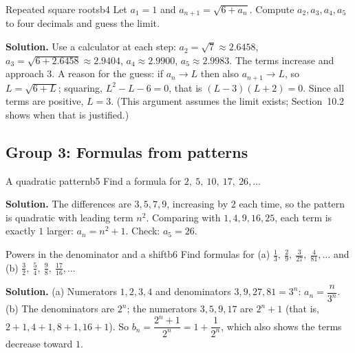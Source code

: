 \documentclass[11pt]{article}
\begin{document}
\begin{exmp}{Repeated square roots}{b4}
Let $a_1=1$ and $a_{n+1}=\sqrt{6+a_n}$. Compute $a_2,a_3,a_4,a_5$ to four decimals and guess the limit.

\textbf{Solution.} Use a calculator at each step: $a_2=\sqrt7\approx2.6458$, $a_3=\sqrt{6+2.6458}\approx2.9404$, $a_4\approx2.9900$, $a_5\approx2.9983$.
The terms increase and approach $3$. A reason for the guess: if $a_n\to L$ then also $a_{n+1}\to L$, so $L=\sqrt{6+L}$; squaring, $L^2-L-6=0$, that is $(L-3)(L+2)=0$. Since all terms are positive, $L=3$. (This argument assumes the limit exists; Section~10.2 shows when that is justified.)
\end{exmp}

\subsection*{Group 3: Formulas from patterns}

\begin{exmp}{A quadratic pattern}{b5}
Find a formula for $2,\ 5,\ 10,\ 17,\ 26,\dots$

\textbf{Solution.} The differences are $3,5,7,9$, increasing by $2$ each time, so the pattern is quadratic with leading term $n^2$. Comparing with $1,4,9,16,25$, each term is exactly $1$ larger: $a_n=n^2+1$. Check: $a_5=26$.
\end{exmp}

\begin{exmp}{Powers in the denominator and a shift}{b6}
Find formulas for (a) $\frac13,\ \frac29,\ \frac3{27},\ \frac4{81},\dots$ and (b) $\frac32,\ \frac54,\ \frac98,\ \frac{17}{16},\dots$

\textbf{Solution.} (a) Numerators $1,2,3,4$ and denominators $3,9,27,81=3^n$: $a_n=\dfrac n{3^n}$. (b) The denominators are $2^n$; the numerators $3,5,9,17$ are $2^n+1$ (that is, $2+1,4+1,8+1,16+1$). So $b_n=\dfrac{2^n+1}{2^n}=1+\dfrac1{2^n}$, which also shows the terms decrease toward $1$.
\end{exmp}
\end{document}
